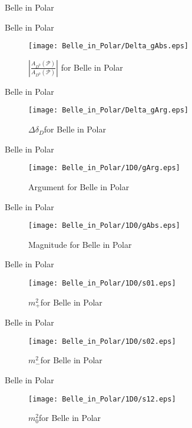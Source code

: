 \documentclass{beamer}
\newcommand{\strphdiff}{\ensuremath{\Delta \delta_D}}
\newcommand{\MP}{\ensuremath{m^2_+}}
\newcommand{\MM}{\ensuremath{m^2_-}}
\newcommand{\MZ}{\ensuremath{m^2_0}}
\newcommand{\Dz}{\ensuremath{D^0} }
\newcommand{\genAmp}[2]{\ensuremath{A_{#1}^{\text{#2}}\left(\mathcal{P} \right)}}
\begin{document}
\begin{frame}{Belle in Polar}
\begin{tiny}
\end{tiny}
\end{frame}
\begin{frame}{Belle in Polar}
\begin{figure}
\texttt{[image: Belle\_in\_Polar/Delta\_gAbs.eps]}
\caption{$\left|\frac{\genAmp{\Dz}{}}{\genAmp{\Dz}{}}\right|$ for Belle in Polar}
\end{figure}
\end{frame}
\begin{frame}{Belle in Polar}
\begin{figure}
\texttt{[image: Belle\_in\_Polar/Delta\_gArg.eps]}
\caption{\strphdiff for Belle in Polar}
\end{figure}
\end{frame}
\begin{frame}{Belle in Polar}
\begin{figure}
\texttt{[image: Belle\_in\_Polar/1D0/gArg.eps]}
\caption{Argument for Belle in Polar}
\end{figure}
\end{frame}
\begin{frame}{Belle in Polar}
\begin{figure}
\texttt{[image: Belle\_in\_Polar/1D0/gAbs.eps]}
\caption{Magnitude for Belle in Polar}
\end{figure}
\end{frame}
\begin{frame}{Belle in Polar}
\begin{figure}
\texttt{[image: Belle\_in\_Polar/1D0/s01.eps]}
\caption{\MP for Belle in Polar}
\end{figure}
\end{frame}
\begin{frame}{Belle in Polar}
\begin{figure}
\texttt{[image: Belle\_in\_Polar/1D0/s02.eps]}
\caption{\MM for Belle in Polar}
\end{figure}
\end{frame}
\begin{frame}{Belle in Polar}
\begin{figure}
\texttt{[image: Belle\_in\_Polar/1D0/s12.eps]}
\caption{\MZ for Belle in Polar}
\end{figure}
\end{frame}
\end{document}
